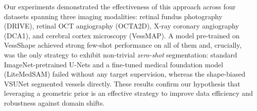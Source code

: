 \documentclass[twocolumn]{article}
\begin{document}
Our experiments demonstrated the effectiveness of this approach across four datasets spanning three imaging modalities: retinal fundus photography (DRIVE), retinal OCT angiography (OCTA2D), X-ray coronary angiography (DCA1), and cerebral cortex microscopy (VessMAP). A model pre-trained on VessShape achieved strong few-shot performance on all of them and, crucially, was the only strategy to exhibit non-trivial \emph{zero-shot} segmentation: standard ImageNet-pretrained U-Nets and a fine-tuned medical foundation model (LiteMedSAM) failed without any target supervision, whereas the shape-biased VSUNet segmented vessels directly. These results confirm our hypothesis that leveraging a geometric prior is an effective strategy to improve data efficiency and robustness against domain shifts.
\end{document}
